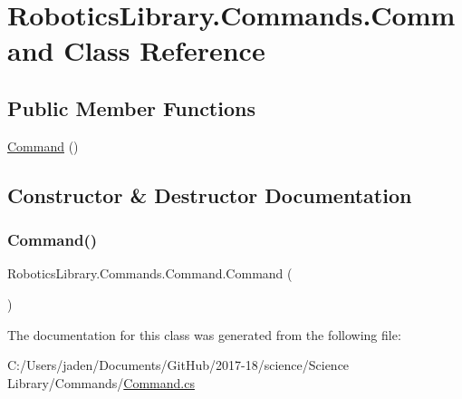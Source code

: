 \hypertarget{class_robotics_library_1_1_commands_1_1_command}{}\section{Robotics\+Library.\+Commands.\+Command Class Reference}
\label{class_robotics_library_1_1_commands_1_1_command}
\subsection*{Public Member Functions}
\begin{DoxyCompactItemize}
\item 
\hyperlink{class_robotics_library_1_1_commands_1_1_command_a1bfb451ce5eb9f1bbb5aa2b6a934e302}{Command} ()
\end{DoxyCompactItemize}


\subsection{Constructor \& Destructor Documentation}
\mbox{\label{class_robotics_library_1_1_commands_1_1_command_a1bfb451ce5eb9f1bbb5aa2b6a934e302}} 
\subsubsection{\texorpdfstring{Command()}{Command()}}
{\footnotesize\ttfamily Robotics\+Library.\+Commands.\+Command.\+Command (\begin{DoxyParamCaption}{ }\end{DoxyParamCaption})}



The documentation for this class was generated from the following file\+:\begin{DoxyCompactItemize}
\item 
C\+:/\+Users/jaden/\+Documents/\+Git\+Hub/2017-\/18/science/\+Science Library/\+Commands/\hyperlink{_command_8cs}{Command.\+cs}\end{DoxyCompactItemize}
